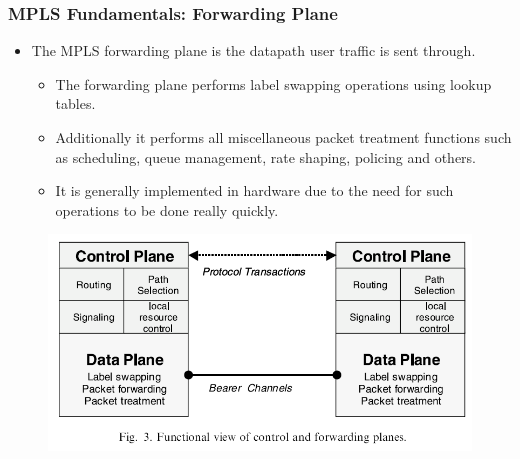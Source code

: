 \documentclass[12pt]{beamer}
\begin{document}
\begin{frame}
	\frametitle{MPLS Fundamentals: Forwarding Plane}
    \begin{itemize}
    \item The MPLS forwarding plane is the datapath user traffic is sent through. 
	    \begin{itemize}
		    \item The forwarding plane performs label swapping operations using lookup tables.
            \item Additionally it performs all miscellaneous packet treatment functions such as scheduling, queue management, rate shaping, policing and others.
		    \item It is generally implemented in hardware due to the need for such operations to be done really quickly.
	    \end{itemize}
    \end{itemize}
	\begin{figure}[h]
		\begin{center}
			\includegraphics[scale=0.35]{label.png}
		\end{center}
	\end{figure}	
\end{frame}
\end{document}
